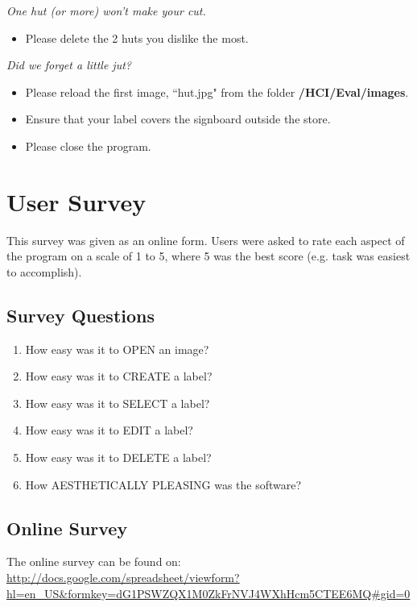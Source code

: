 \documentclass[11pt,twocolumn]{article}
\begin{document}
 \indent \indent \indent \indent \indent \indent  \indent \indent \indent  \indent \indent \indent \indent
\indent \indent \indent \indent \indent \indent \emph{One hut (or more) won’t make your cut.}
\begin{itemize}
\item Please delete the 2 huts you dislike the most.
\end{itemize}

 \indent \indent
\indent \indent \indent \indent \indent \indent  \indent \indent \indent  \indent \indent \indent \indent \indent \indent 
\indent  \indent \indent \indent \indent  \indent \indent \indent  \emph{Did we forget a little jut?}
\begin{itemize}
\item Please reload the first image, ``hut.jpg" from the folder {\bf /HCI/Eval/images}.
\item Ensure that your label covers the signboard outside the store.
\end{itemize}

\begin{itemize}
\item Please close the program.
\end{itemize}

\newpage
\section{User Survey}

This survey was given as an online form. Users were asked to rate each aspect of the program on a scale of 1 to 5, where 5 was the best score (e.g. task was easiest to accomplish). 

\subsection{Survey Questions}

\begin{enumerate}
\item How easy was it to OPEN an image? 
\item How easy was it to CREATE a label?
\item How easy was it to SELECT a label?
\item How easy was it to EDIT a label? 
\item How easy was it to DELETE a label?
\item How AESTHETICALLY PLEASING was the software?
\end{enumerate}

\subsection{Online Survey}

The online survey can be found on:\\ \url{http://docs.google.com/spreadsheet/viewform?hl=en_US&formkey=dG1PSWZQX1M0ZkFrNVJ4WXhHcm5CTEE6MQ#gid=0}
\end{document}
